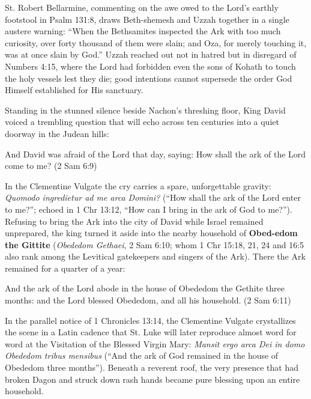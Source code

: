 St. Robert Bellarmine, commenting on the awe owed to the Lord's earthly footstool in Psalm 131:8, draws Beth-shemesh and Uzzah together in a single austere warning: ``When the Bethsamites inspected the Ark with too much curiosity, over forty thousand of them were slain; and Oza, for merely touching it, was at once slain by God.'' Uzzah reached out not in hatred but in disregard of Numbers 4:15, where the Lord had forbidden even the sons of Kohath to touch the holy vessels lest they die; good intentions cannot supersede the order God Himself established for His sanctuary.

Standing in the stunned silence beside Nachon's threshing floor, King David voiced a trembling question that will echo across ten centuries into a quiet doorway in the Judean hills:

\begin{scriptureblock}
And David was afraid of the Lord that day, saying: How shall the ark of the Lord come to me? \textnormal{(2 Sam 6:9)}
\end{scriptureblock}

In the Clementine Vulgate the cry carries a spare, unforgettable gravity: \textit{Quomodo ingredietur ad me arca Domini?} (``How shall the ark of the Lord enter to me?''; echoed in 1 Chr 13:12, ``How can I bring in the ark of God to me?''). Refusing to bring the Ark into the city of David while Israel remained unprepared, the king turned it aside into the nearby household of \textbf{Obed-edom the Gittite} (\textit{Obededom Gethaei}, 2 Sam 6:10; whom 1 Chr 15:18, 21, 24 and 16:5 also rank among the Levitical gatekeepers and singers of the Ark). There the Ark remained for a quarter of a year:

\begin{scriptureblock}
And the ark of the Lord abode in the house of Obededom the Gethite three months: and the Lord blessed Obededom, and all his household. \textnormal{(2 Sam 6:11)}
\end{scriptureblock}

In the parallel notice of 1 Chronicles 13:14, the Clementine Vulgate crystallizes the scene in a Latin cadence that St. Luke will later reproduce almost word for word at the Visitation of the Blessed Virgin Mary: \textit{Mansit ergo arca Dei in domo Obededom tribus mensibus} (``And the ark of God remained in the house of Obededom three months''). Beneath a reverent roof, the very presence that had broken Dagon and struck down rash hands became pure blessing upon an entire household.

